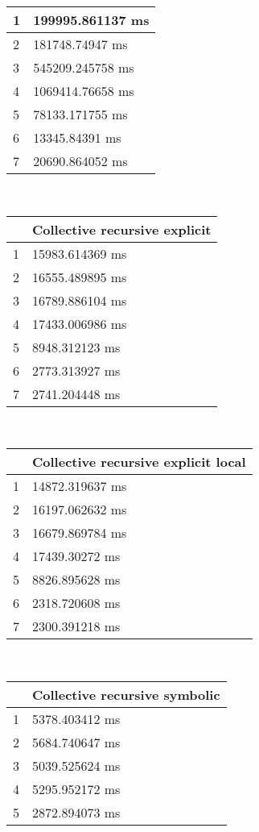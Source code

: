 \begin{multicols}{2}
\begin{tabular}{|l|l|}
		1 & 199995.861137 ms \\ \hline
		2 & 181748.74947 ms \\ \hline
		3 & 545209.245758 ms \\ \hline
		4 & 1069414.76658 ms \\ \hline
		5 & 78133.171755 ms \\ \hline
		6 & 13345.84391 ms \\ \hline
		7 & 20690.864052 ms \\ \hline
	\end{tabular}\\
	\begin{tabular}{|l|l|}
		\hline
		& Collective recursive explicit \\ \hline
		1 & 15983.614369 ms \\ \hline
		2 & 16555.489895 ms \\ \hline
		3 & 16789.886104 ms \\ \hline
		4 & 17433.006986 ms \\ \hline
		5 & 8948.312123 ms \\ \hline
		6 & 2773.313927 ms \\ \hline
		7 & 2741.204448 ms \\ \hline
	\end{tabular}\\
	\begin{tabular}{|l|l|}
		\hline
		& Collective recursive explicit local \\ \hline
		1 & 14872.319637 ms \\ \hline
		2 & 16197.062632 ms \\ \hline
		3 & 16679.869784 ms \\ \hline
		4 & 17439.30272 ms \\ \hline
		5 & 8826.895628 ms \\ \hline
		6 & 2318.720608 ms \\ \hline
		7 & 2300.391218 ms \\ \hline
	\end{tabular}\\
	\begin{tabular}{|l|l|}
		\hline
		& Collective recursive symbolic \\ \hline
		1 & 5378.403412 ms \\ \hline
		2 & 5684.740647 ms \\ \hline
		3 & 5039.525624 ms \\ \hline
		4 & 5295.952172 ms \\ \hline
		5 & 2872.894073 ms \\ \hline

\end{tabular}
\end{multicols}
